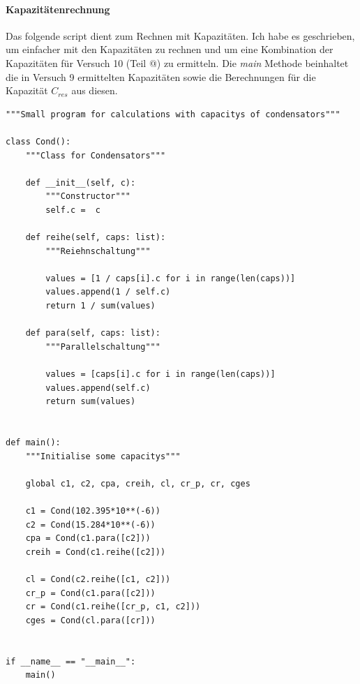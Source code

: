 \documentclass[10pt,a4paper]{article}
\makeatletter
\newcommand*{\rom}[1]{\expandafter\@slowromancap\romannumeral #1@}
\makeatother
\begin{document}
\paragraph{Kapazitätenrechnung}
\begin{flushleft}
Das folgende script dient zum Rechnen mit Kapazitäten. Ich habe es geschrieben, um einfacher mit den Kapazitäten zu rechnen und um eine Kombination der Kapazitäten für Versuch 10 (Teil \rom{3}) zu ermitteln. Die \textit{main} Methode beinhaltet die in Versuch 9 ermittelten Kapazitäten sowie die Berechnungen für die Kapazität $C_{res}$ aus diesen.

\scriptsize
\begin{verbatim}
"""Small program for calculations with capacitys of condensators"""

class Cond():
    """Class for Condensators"""

    def __init__(self, c):
        """Constructor"""
        self.c =  c

    def reihe(self, caps: list):
        """Reiehnschaltung"""

        values = [1 / caps[i].c for i in range(len(caps))]
        values.append(1 / self.c)
        return 1 / sum(values)

    def para(self, caps: list):
        """Parallelschaltung"""

        values = [caps[i].c for i in range(len(caps))]
        values.append(self.c)
        return sum(values)


def main():
    """Initialise some capacitys"""

    global c1, c2, cpa, creih, cl, cr_p, cr, cges

    c1 = Cond(102.395*10**(-6))
    c2 = Cond(15.284*10**(-6))
    cpa = Cond(c1.para([c2]))
    creih = Cond(c1.reihe([c2]))

    cl = Cond(c2.reihe([c1, c2]))
    cr_p = Cond(c1.para([c2]))
    cr = Cond(c1.reihe([cr_p, c1, c2]))
    cges = Cond(cl.para([cr]))


if __name__ == "__main__":
    main()
\end{verbatim}
\normalsize

\end{flushleft}
\end{document}
